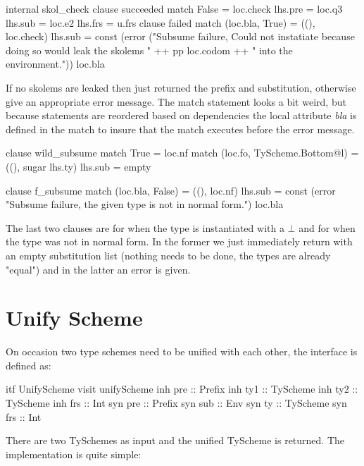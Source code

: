 \begin{code}
   internal skol_check
     clause succeeded
       match False  = loc.check
       lhs.pre = loc.q3
       lhs.sub = loc.e2
       lhs.frs = u.frs
     clause failed
       match (loc.bla, True) = ((), loc.check)
       lhs.sub = const (error ("Subsume failure, Could not instatiate because doing so would leak the skolems " ++ pp loc.codom ++ " into the environment.")) loc.bla
\end{code}
If no skolems are leaked then just returned the prefix and substitution, otherwise give an appropriate error message. The match statement looks a bit weird, but because statements are reordered based on dependencies the local attribute \emph{bla} is defined in the match to insure that the match executes before the error message.

\begin{code}
   clause wild_subsume
     match True                        = loc.nf
     match (loc.fo, TyScheme.Bottom@l) = ((), sugar lhs.ty)
     lhs.sub = empty
     
   clause f_subsume
     match (loc.bla, False) = ((), loc.nf)
     lhs.sub = const (error "Subsume failure, the given type is not in normal form.") loc.bla
\end{code}
The last two clauses are for when the type is instantiated with a $\bot$ and for when the type was not in normal form. In the former we just immediately return with an empty substitution list (nothing needs to be done, the types are already "equal") and in the latter an error is given.

\section{Unify Scheme} 
On occasion two type schemes need to be unified with each other, the interface is defined as:

\begin{code}
itf UnifyScheme
  visit unifyScheme
    inh pre  :: Prefix
    inh ty1  :: TyScheme
    inh ty2  :: TyScheme
    inh frs  :: Int
    syn pre  :: Prefix
    syn sub  :: Env
    syn ty   :: TyScheme
    syn frs  :: Int 
\end{code}

There are two TySchemes as input and the unified TyScheme is returned. The implementation is quite simple:

